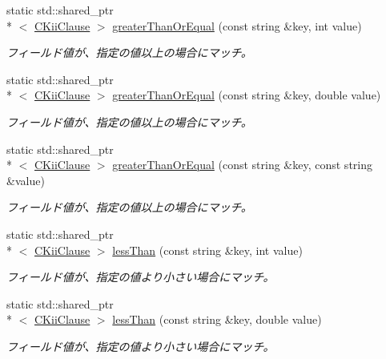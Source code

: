 \begin{DoxyCompactItemize}
static std\-::shared\-\_\-ptr\\*
$<$ \hyperlink{class_c_kii_clause}{C\-Kii\-Clause} $>$ \hyperlink{class_c_kii_clause_af2e77eb171a8abef023211d92a418f2c}{greater\-Than\-Or\-Equal} (const string \&key, int value)
\begin{DoxyCompactList}\small\item\em フィールド値が、指定の値以上の場合にマッチ。 \end{DoxyCompactList}\item 
static std\-::shared\-\_\-ptr\\*
$<$ \hyperlink{class_c_kii_clause}{C\-Kii\-Clause} $>$ \hyperlink{class_c_kii_clause_ab051c9136381a6b42b411101aee2069e}{greater\-Than\-Or\-Equal} (const string \&key, double value)
\begin{DoxyCompactList}\small\item\em フィールド値が、指定の値以上の場合にマッチ。 \end{DoxyCompactList}\item 
static std\-::shared\-\_\-ptr\\*
$<$ \hyperlink{class_c_kii_clause}{C\-Kii\-Clause} $>$ \hyperlink{class_c_kii_clause_a349c83b0e32f0133103c731667db5518}{greater\-Than\-Or\-Equal} (const string \&key, const string \&value)
\begin{DoxyCompactList}\small\item\em フィールド値が、指定の値以上の場合にマッチ。 \end{DoxyCompactList}\item 
static std\-::shared\-\_\-ptr\\*
$<$ \hyperlink{class_c_kii_clause}{C\-Kii\-Clause} $>$ \hyperlink{class_c_kii_clause_a8d485b3e6c354985dfdb9925387da4d9}{less\-Than} (const string \&key, int value)
\begin{DoxyCompactList}\small\item\em フィールド値が、指定の値より小さい場合にマッチ。 \end{DoxyCompactList}\item 
static std\-::shared\-\_\-ptr\\*
$<$ \hyperlink{class_c_kii_clause}{C\-Kii\-Clause} $>$ \hyperlink{class_c_kii_clause_af61bde1e5bf272d9bb97d53d47b04c7f}{less\-Than} (const string \&key, double value)
\begin{DoxyCompactList}\small\item\em フィールド値が、指定の値より小さい場合にマッチ。 \end{DoxyCompactList}\item 

\end{DoxyCompactItemize}
